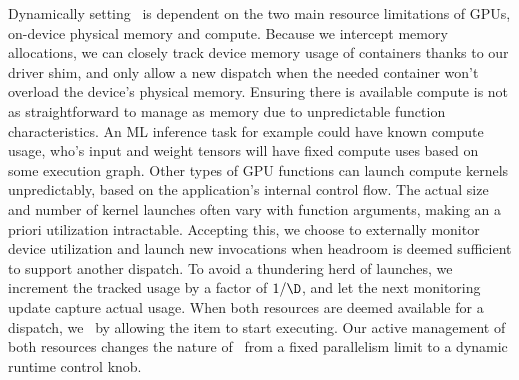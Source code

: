 Dynamically setting \D~is dependent on the two main resource limitations of GPUs, on-device physical memory and compute.
Because we intercept memory allocations, we can closely track device memory usage of containers thanks to our driver shim, and only allow a new dispatch when the needed container won't overload the device's physical memory.
Ensuring there is available compute is not as straightforward to manage as memory due to unpredictable function characteristics.
An ML inference task for example could have known compute usage, who's input and weight tensors will have fixed compute uses based on some execution graph.
Other types of GPU functions can launch compute kernels unpredictably, based on the application's internal control flow.
The actual size and number of kernel launches often vary with function arguments, making an a priori utilization intractable.
Accepting this, we choose to externally monitor device utilization and launch new invocations when headroom is deemed sufficient to support another dispatch.
To avoid a thundering herd of launches, we increment the tracked usage by a factor of $1/\D$, and let the next monitoring update capture actual usage.
When both resources are deemed available for a dispatch, we  \D~by allowing the item to start executing.
Our active management of both resources changes the nature of \D~from a fixed parallelism limit to a dynamic runtime control knob.


